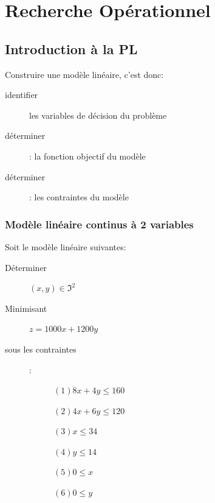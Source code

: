 \part{Recherche Opérationnel}
\pagebreak
\chapter{Introduction à la PL}\pagebreak

Construire une modèle linéaire, c'est donc:
\begin{description}
\item[identifier] les variables de décision du problème
\item[déterminer]: la fonction objectif du modèle
\item[déterminer]: les contraintes du modèle 
\end{description}

\section{Modèle linéaire continus à 2 variables}
Soit le modèle linéaire suivantes:
\begin{description}
\item[Déterminer] $(x,y) \in \Im^2$
\item[Minimisant] $z = 1000x + 1200y$
\item[sous les contraintes]:
\begin{description}
\item[] $(1) 8x + 4y \leq 160$
\item[] $(2) 4x + 6y \leq 120$
\item[] $(3) x \leq 34$
\item[] $(4) y \leq 14$
\item[] $(5) 0 \leq x$
\item[] $(6) 0 \leq y$
\end{description}
\end{description}

